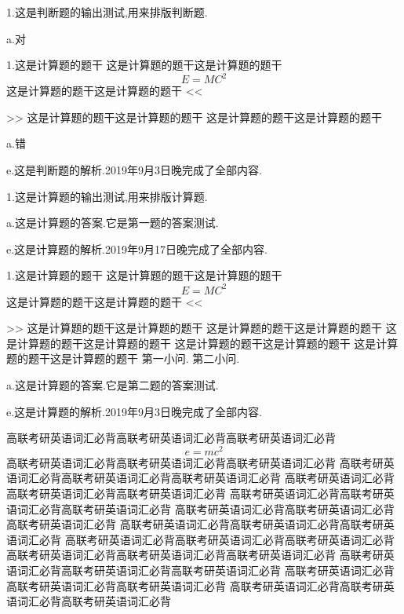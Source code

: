 \documentclass[a4paper,fontset = windowsnew]{ctexbook}
\begin{document}
\newpage

\begin{judgements}
  1.这是判断题的输出测试,用来排版判断题.

  a.对

1.这是计算题的题干
这是计算题的题干这是计算题的题干
\begin{equation}
  E=MC^2
\end{equation}
这是计算题的题干这是计算题的题干
<<
>>
这是计算题的题干这是计算题的题干
这是计算题的题干这是计算题的题干

a.错

e.这是判断题的解析.2019年9月3日晚完成了全部内容.

\end{judgements}

\begin{calculations}
  1.这是计算题的输出测试,用来排版计算题.

  a.这是计算题的答案.它是第一题的答案测试.

e.这是计算题的解析.2019年9月17日晚完成了全部内容.

1.这是计算题的题干
这是计算题的题干这是计算题的题干
\[  E=MC^2 \]
这是计算题的题干这是计算题的题干
<<
>>
这是计算题的题干这是计算题的题干
这是计算题的题干这是计算题的题干
这是计算题的题干这是计算题的题干
这是计算题的题干这是计算题的题干
这是计算题的题干这是计算题的题干
\qitem 第一小问.
\qitem 第二小问.

  a.这是计算题的答案.它是第二题的答案测试.

e.这是计算题的解析.2019年9月3日晚完成了全部内容.

\end{calculations}

%
高联考研英语词汇必背高联考研英语词汇必背高联考研英语词汇必背
\[e=mc^2\]
高联考研英语词汇必背高联考研英语词汇必背高联考研英语词汇必背
高联考研英语词汇必背高联考研英语词汇必背高联考研英语词汇必背
高联考研英语词汇必背高联考研英语词汇必背高联考研英语词汇必背
高联考研英语词汇必背高联考研英语词汇必背高联考研英语词汇必背
高联考研英语词汇必背高联考研英语词汇必背高联考研英语词汇必背
高联考研英语词汇必背高联考研英语词汇必背高联考研英语词汇必背
高联考研英语词汇必背高联考研英语词汇必背高联考研英语词汇必背
高联考研英语词汇必背高联考研英语词汇必背高联考研英语词汇必背
高联考研英语词汇必背高联考研英语词汇必背高联考研英语词汇必背
高联考研英语词汇必背高联考研英语词汇必背高联考研英语词汇必背
高联考研英语词汇必背高联考研英语词汇必背高联考研英语词汇必背
\end{document}
